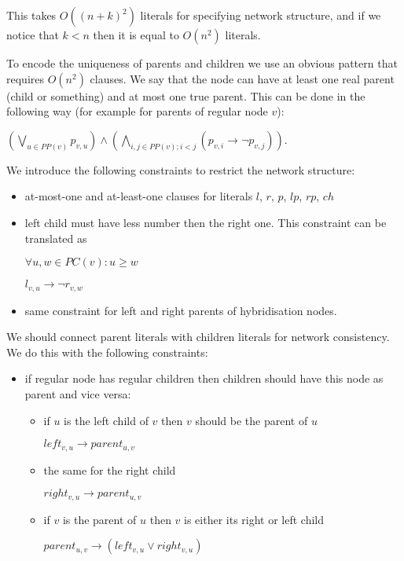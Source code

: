 \documentclass[runningheads, envcountsame, a4paper]{llncs}
\begin{document}
This takes $O((n + k)^2)$ literals for specifying network structure, and if we notice that $k < n$ then it is equal to $O(n^2)$ literals.

To encode the uniqueness of parents and children we use an obvious pattern that requires $O(n^2)$ clauses. We say that the node can have at least one real parent (child or something) and at most one true parent. This can be done in the following way (for example for parents of regular node $v$):

$(\bigvee\limits_{u \in PP(v)} p_{v,u}) \wedge (\bigwedge\limits_{i, j \in PP(v);i < j} (p_{v,i} \rightarrow \neg p_{v,j}))$.

We introduce the following constraints to restrict the network structure:

\begin{itemize}

\item at-most-one and at-least-one clauses for literals $l$, $r$, $p$, $lp$, $rp$, $ch$

\item left child must have less number then the right one. This constraint can be translated as 
      
      $\forall u, w \in PC(v): u \geq w$

      $l_{v,u} \rightarrow \neg r_{v,w}$
      
\item same constraint for left and right parents of hybridisation nodes.

\end{itemize}

We should connect parent literals with children literals for network consistency. We do this with the following constraints:

\begin{itemize}

\item if regular node has regular children then children should have this node as parent and vice versa:
    \begin{itemize}
    \item if $u$ is the left child of $v$ then $v$ should be the parent of $u$
    
    $left_{v,u} \rightarrow parent_{u,v}$
    \item the same for the right child
    
    $right_{v,u} \rightarrow parent_{u,v}$ 
    \item if $v$ is the parent of $u$ then $v$ is either its right or left child
    
    $parent_{u,v} \rightarrow (left_{v,u} \vee right_{v,u})$
    \end{itemize}

\end{itemize}
\end{document}
